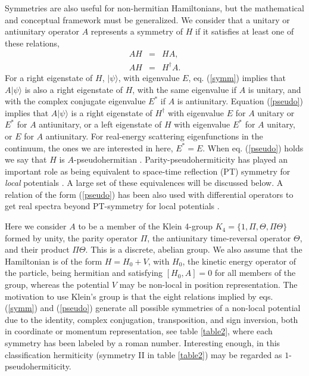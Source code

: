 Symmetries are also useful for  non-hermitian Hamiltonians, but the mathematical and conceptual
framework must be generalized. We consider that a unitary or antiunitary operator $A$ represents a symmetry of $H$ if it satisfies
at least one of these relations,
%
\begin{eqnarray}
  AH&=&HA,
  \label{symm}
  \\
  AH&=&H^\dagger A.
  \label{pseudo}
\end{eqnarray}
%
For a right eigenstate of $H$, $|\psi\rangle$,
with eigenvalue $E$, eq. (\ref{symm}) implies that
$A|\psi\rangle$ is also a right  eigenstate of $H$, with the
same eigenvalue if $A$ is unitary, and with the complex conjugate eigenvalue $E^*$ if $A$ is antiunitary.
Equation (\ref{pseudo}) implies that $A|\psi\rangle$ is a right eigenstate of $H^\dagger$
with eigenvalue $E$ for $A$ unitary or $E^*$ for $A$ antiunitary, or a left eigenstate of $H$ with eigenvalue $E^*$ for $A$ unitary, or $E$
for $A$ antiunitary. For real-energy scattering
eigenfunctions in the continuum, the ones we are interested in here, $E^*=E$.
When eq. (\ref{pseudo}) holds we say that $H$ is $A$-pseudohermitian \cite{Mostafazadeh2010}.
Parity-pseudohermiticity has played an important role as being equivalent to space-time reflection (PT) symmetry for {\it local} potentials
\cite{Mostafazadeh2010,Znojil2015}. A large set of these equivalences
will be discussed below.
A relation of the form (\ref{pseudo}) has been also used with differential operators  to get real spectra beyond
PT-symmetry for local potentials  \cite{Nixon2016,Nixon2016a}.

Here we consider
$A$ to be a member of the
Klein 4-group $K_4=\{1,\Pi, \Theta, \Pi\Theta\}$ formed by unity, the parity operator $\Pi$, the antiunitary time-reversal operator $\Theta$, and their product
$\Pi\Theta$. This is a discrete, abelian group.
We also assume that the  Hamiltonian is  of the form $H=H_0+V$, with $H_0$, the kinetic energy operator of the particle,
being hermitian and
satisfying $[H_0,A]=0$ for all members of the group, whereas the potential $V$ may be non-local in position representation.
The  motivation to use Klein's group is that the eight relations implied by eqs. (\ref{symm}) and (\ref{pseudo}) generate all
possible symmetries of a non-local potential due to the identity, complex conjugation, transposition, and sign inversion,
both in coordinate or momentum representation, see table \ref{table2}, where each symmetry has been labeled by a roman number.
Interesting enough, in this classification hermiticity (symmetry II in  table \ref{table2})
may be regarded as $1$-pseudohermiticity.

